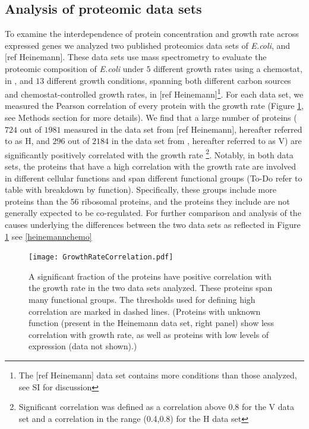 \documentclass[notitlepage]{article}
\begin{document}
\subsection{Analysis of proteomic data sets}
To examine the interdependence of protein concentration and growth rate across expressed genes we analyzed two published proteomics data sets of \emph{E.coli}, \parencite{Valgepea2013} and [ref Heinemann].
These data sets use mass spectrometry to evaluate the proteomic composition of \emph{E.coli} under $5$ different growth rates using a chemostat, in \parencite{Valgepea2013}, and $13$ different growth conditions, spanning both different carbon sources and chemostat-controlled growth rates, in [ref Heinemann]\footnote{The [ref Heinemann] data set contains more conditions than those analyzed, see SI for discussion}.
For each data set, we measured the Pearson correlation of every protein with the growth rate (Figure \ref{fig:growthcorr}, see Methods section for more details).
We find that a large number of proteins ($724$ out of $1981$ measured in the data set from [ref Heinemann], hereafter referred to as H, and $296$ out of $2184$ in the data set from \parencite{Valgepea2013}, hereafter referred to as V) are significantly positively correlated with the growth rate \footnote{Significant correlation was defined as a correlation above 0.8 for the V data set and a correlation in the range (0.4,0.8) for the H data set}.
Notably, in both data sets, the proteins that have a high correlation with the growth rate are involved in different cellular functions and span different functional groups (To-Do refer to table with breakdown by function).
Specifically, these groups include more proteins than the 56 ribosomal proteins, and the proteins they include are not generally expected to be co-regulated.
For further comparison and analysis of the causes underlying the differences between the two data sets as reflected in Figure \ref{fig:growthcorr} see \ref{heinemannchemo}

\begin{figure}[h]
\centering
\texttt{[image: GrowthRateCorrelation.pdf]}
\caption{
A significant fraction of the proteins have positive correlation with the growth rate in the two data sets analyzed.
These proteins span many functional groups.
The thresholds used for defining high correlation are marked in dashed lines.
(Proteins with unknown function (present in the Heinemann data set, right panel) show less correlation with growth rate, as well as proteins with low levels of expression (data not shown).)
}
\label{fig:growthcorr}
\end{figure}
\end{document}

